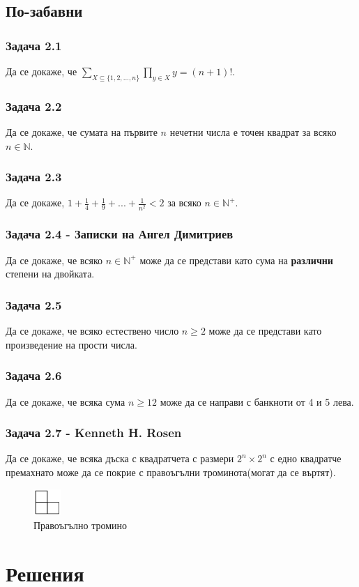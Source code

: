 \documentclass[12pt]{article}
\begin{document}
\subsection*{По-забавни}
\subsubsection*{Задача 2.1}
Да се докаже, че $\displaystyle\sum_{X \subseteq \{ 1, 2, ..., n \}} \prod_{y \in X} y = (n+1)!$.
\subsubsection*{Задача 2.2}
Да се докаже, че сумата на първите $n$ нечетни числа е точен квадрат за всяко $n \in \mathbb{N}$.
\subsubsection*{Задача 2.3}
Да се докаже, $1 + \frac{1}{4} + \frac{1}{9} + ... + \frac{1}{n^2} < 2$ за всяко $n \in \mathbb{N}^+$.
\subsubsection*{Задача 2.4 - Записки на Ангел Димитриев}
Да се докаже, че всяко $n \in \mathbb{N}^+$ може да се представи като сума на \textbf{различни} степени на двойката.
\subsubsection*{Задача 2.5}
Да се докаже, че всяко естествено число $n \geq 2$ може да се представи като произведение на прости числа.
\subsubsection*{Задача 2.6}
Да се докаже, че всяка сума $n \geq 12$ може да се направи с банкноти от 4 и 5 лева.
\subsubsection*{Задача 2.7 - Kenneth H. Rosen}
Да се докаже, че всяка дъска с квадратчета с размери $2^n \times 2^n$ с едно квадратче премахнато може да се покрие с правоъгълни троминота(могат да се въртят).
\begin{figure}[!ht]
    \caption*{Правоъгълно тромино}
    \centering
    \includegraphics[height=1cm]{right-trominoe}
\end{figure}
    


\section*{Решения}
\end{document}
